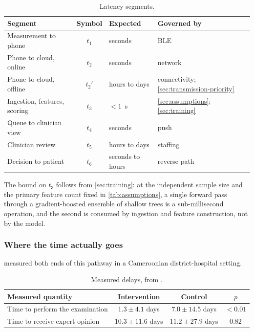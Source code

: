 \documentclass[12pt,a4paper,oneside]{report}
\begin{document}
\begin{table}[htbp]
\centering\small
\caption{Latency segments.}\label{tab:latency}
\begin{tabularx}{\textwidth}{@{}X c >{\raggedright\arraybackslash}p{2.6cm} >{\raggedright\arraybackslash}p{3.4cm}@{}}
\toprule
\textbf{Segment} & \textbf{Symbol} & \textbf{Expected} & \textbf{Governed by} \\
\midrule
Measurement to phone & $t_1$ & seconds & BLE \\
Phone to cloud, online & $t_2$ & seconds & network \\
Phone to cloud, offline & $t_2'$ & hours to days & connectivity; \cref{sec:transmission-priority} \\
Ingestion, features, scoring & $t_3$ & $<1$~s & \cref{sec:assumptions}; \cref{sec:training} \\
Queue to clinician view & $t_4$ & seconds & push \\
Clinician review & $t_5$ & hours to days & staffing \\
Decision to patient & $t_6$ & seconds to hours & reverse path \\
\bottomrule
\end{tabularx}
\end{table}

The bound on $t_3$ follows from \cref{sec:training}: at the independent sample size and the primary feature count fixed in \cref{tab:assumptions}, a single forward pass through a gradient-boosted ensemble of shallow trees is a sub-millisecond operation, and the second is consumed by ingestion and feature construction, not by the model.

\subsubsection{Where the time actually goes}

\Textcite{bediang2021} measured both ends of this pathway in a Cameroonian district-hospital setting.

\begin{table}[htbp]
\centering\small
\caption{Measured delays, from \textcite{bediang2021}.}\label{tab:bediang-latency}
\begin{tabularx}{\textwidth}{@{}X c c c@{}}
\toprule
\textbf{Measured quantity} & \textbf{Intervention} & \textbf{Control} & \textbf{$p$} \\
\midrule
Time to perform the examination & $1.3 \pm 4.1$ days & $7.0 \pm 14.5$ days & $<0.01$ \\
Time to receive expert opinion & $10.3 \pm 11.6$ days & $11.2 \pm 27.9$ days & $0.82$ \\
\bottomrule
\end{tabularx}
\end{table}
\end{document}
